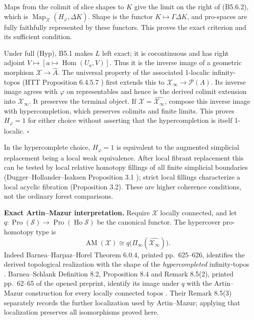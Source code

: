 Maps from the colimit of slice shapes to \(K\) give the limit on the
right of (B5.6.2), which is
\(\operatorname{Map}_{\mathscr X}(H_\varphi,\Delta K)\). Shape is the
functor \(K\mapsto\Gamma\Delta K\), and pro-spaces are fully faithfully
represented by these functors. This proves the exact criterion and its
sufficient condition.

Under full (Hyp), B5.1 makes \(L\) left exact; it is cocontinuous and
has right adjoint \(V\mapsto[a\mapsto\operatorname{Hom}(U_a,V)]\). Thus
it is the inverse image of a geometric morphism
\(\mathcal X\to\widehat A\). The universal property of the associated
1-localic infinity-topos (HTT Proposition 6.4.5.7
\cite[Proposition 6.4.5.7]{B56HTT}) first extends this to
\(\mathcal X_\infty\to\mathcal P(A)\). Its inverse image agrees with
\(\varphi\) on representables and hence is the derived colimit extension
into \(\mathcal X_\infty\). It preserves the terminal object. If
\(\mathscr X=\widehat{\mathcal X_\infty}\), compose this inverse image
with hypercompletion, which preserves colimits and finite limits. This
proves \(H_\varphi=1\) for either choice without asserting that the
hypercompletion is itself 1-localic. \(\square\)

In the hypercomplete choice, \(H_\varphi=1\) is equivalent to the
augmented simplicial replacement being a local weak equivalence. After
local fibrant replacement this can be tested by local relative homotopy
fillings of all finite simplicial boundaries (Dugger--Hollander--Isaksen
Proposition 3.1 \cite[Propositions 3.1--3.2]{B56DHI2004}); strict local
fillings characterize a local acyclic fibration (Proposition 3.2). These
are higher coherence conditions, not the ordinary forest comparisons.

\textbf{Exact Artin--Mazur interpretation.} Require \(\mathcal X\)
locally connected, and let
\(q:\operatorname{Pro}(\mathcal S)\to
\operatorname{Pro}(\operatorname{Ho}\mathcal S)\) be the canonical
functor. The hypercover pro-homotopy type is
\[
\operatorname{AM}(\mathcal X)\cong
q\bigl(\Pi_\infty(\widehat{\mathcal X_\infty})\bigr).
\tag{B5.6.3}
\]
Indeed Barnea--Harpaz--Horel Theorem 6.0.4, printed pp.~625--626,
identifies the derived topological realization with the shape of the
\emph{hypercompleted} infinity-topos \cite{B56BHH2017}.
Barnea--Schlank Definition 8.2, Proposition 8.4 and Remark 8.5(2),
printed pp.~62--65 of the opened preprint, identify its image under
\(q\) with the Artin--Mazur construction for every locally connected
topos \cite{B56BarneaSchlank2015}. Their Remark 8.5(3) separately records
the further localization used by Artin--Mazur; applying that localization
preserves all isomorphisms proved here.

